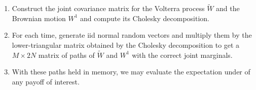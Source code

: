 \begin{enumerate}
\item Construct the joint covariance matrix for the Volterra process $\tilde{W}$ and the Brownian motion $W^1$ and compute its Cholesky decomposition.
\item For each time, generate iid normal random vectors and multiply them
by the lower-triangular matrix obtained by the Cholesky decomposition
to get a $M \times 2 N$ matrix of paths of $\tilde{W}$ and $W^1$ with the correct joint marginals.
\item  With these paths held in memory, we may evaluate the expectation
under of any payoff of interest.
\end{enumerate}

